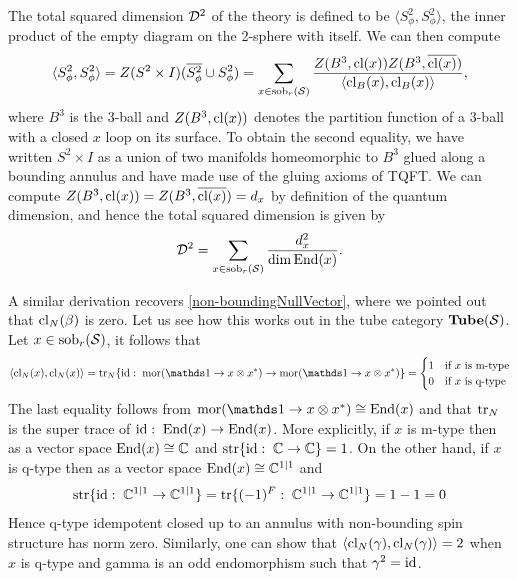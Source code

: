 The total squared dimension $\mathcal{D}^2$ of the theory is defined to be 
$ \langle S^2_\phi, S^2_\phi \rangle$, the inner product of the empty diagram on the 2-sphere with itself.
We can then compute
\begin{align}
\langle S^2_\phi, S^2_\phi \rangle = Z(S^2 \times I)(\overline{S^2_\phi} \cup {S^2_\phi}) = \sum_{x \in \text{sob}_r(\mathcal{S})} \frac{Z(B^3, \text{cl}(x)) Z(B^3, \overline{\text{cl}(x)}) }{\langle  \text{cl}_B(x), \text{cl}_B(x) \rangle},
\end{align}
where $B^3$ is the 3-ball and $Z(B^3,\text{cl}(x))$ denotes the partition function 
of a 3-ball with a closed $x$ loop on its surface.
To obtain the second equality, we have written $S^2\times I$ 
as a union of two manifolds homeomorphic to $B^3$ glued along a bounding annulus and 
have made use of the gluing axioms of TQFT. 
We can compute $Z(B^3, {\text{cl}(x)}) = Z(B^3, \overline{\text{cl}(x)}) = d_x$ by definition of the quantum dimension, and hence the total squared dimension is given by
\begin{align}
\label{total_qdim_defn}
\mathcal{D}^2 = \sum_{x\in \text{sob}_r(\mathcal{S})} \frac{d_x^2}{\dim \text{End}(x)}.
\end{align} 

A similar derivation recovers \eqref{non-boundingNullVector}, 
where we pointed out that $\text{cl}_N(\beta)$ is zero.
Let us see how this works out in the tube category $\textbf{Tube}(\mathcal{S})$.
Let $x \in \text{sob}_r(\mathcal{S})$, it follows that
\begin{align}
\langle \cl_N(x),\cl_N(x) \rangle  = \tr_N\{ \id: \; \mor(\unit \to x \tp x^*) \ra  \mor(\unit \to x \tp x^*)  \}
= \begin{cases} 
1 & \text{if $x$ is m-type} \\
0 & \text{if $x$ is q-type} 
\end{cases}
\end{align} 
The last equality follows from $\mor(\unit \to x \tp x^*)  \cong \End(x)$ 
and that $\text{tr}_N$ is the super trace of $\text{id}: \; \text{End}(x) \to \text{End}(x)$.
More explicitly,
if $x$ is m-type then as a vector space $\text{End}(x) \cong \mathbb{C}$ and $\text{str}\{ \text{id}: \; \mathbb{C} \rightarrow \mathbb{C} \} = 1$. 
On the other hand, if $x$ is q-type then as a vector space $\text{End}(x) \cong \mathbb{C}^{1|1}$ and
\begin{align} 
\text{str} \{\text{id}: \; \mathbb{C}^{1|1} \rightarrow \mathbb{C}^{1|1} \} = \text{tr} \{(-1)^F: \;  \mathbb{C}^{1|1} \rightarrow \mathbb{C}^{1|1} \} =  1-1 = 0
\end{align}
Hence q-type idempotent closed up to an annulus with non-bounding spin structure has norm zero. 
Similarly, one can show that $\langle \text{cl}_N(\gamma), \text{cl}_N(\gamma) \rangle = 2$ 
when $x$ is q-type and gamma is an odd endomorphism such that $\gamma^2 = \text{id}$.

